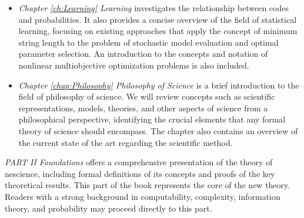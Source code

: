 \begin{itemize}
\item \emph{Chapter \ref{ch:Learning} Learning} investigates the relationship between codes and probabilities. It also provides a concise overview of the field of statistical learning, focusing on existing approaches that apply the concept of minimum string length to the problem of stochastic model evaluation and optimal parameter selection. An introduction to the concepts and notation of nonlinear multiobjective optimization problems is also included.

\item \emph{Chapter \ref{chap:Philosophy} Philosophy of Science} is a brief introduction to the field of philosophy of science. We will review concepts such as scientific representations, models, theories, and other aspects of science from a philosophical perspective, identifying the crucial elements that any formal theory of science should encompass. The chapter also contains an overview of the current state of the art regarding the scientific method.

\end{itemize}

\bigskip

\emph{PART II Foundations} offers a comprehensive presentation of the theory of nescience, including formal definitions of its concepts and proofs of the key theoretical results. This part of the book represents the core of the new theory. Readers with a strong background in computability, complexity, information theory, and probability may proceed directly to this part.

